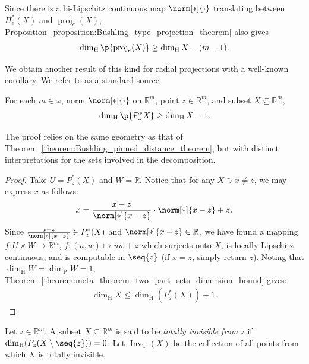 Since there is a bi-Lipschitz continuous map $\norm[*]{\cdot}$ translating between $\Pi^*_e(X)$ and $\operatorname{proj}_e(X)$, Proposition~\ref{proposition:Bushling_type_projection_theorem} also gives
\begin{align*}
    \dim_{\operatorname{H}}\p{\operatorname{proj}_e(X)} \geq \dim_{\operatorname{H}}X - (m - 1).
\end{align*}

We obtain another result of this kind for radial projections with a well-known corollary. We refer \cite{Orp19} to as a standard source.

\begin{proposition}
    \label{proposition:decomposition_result_for_radial_projections}
    For each $m \in \omega$, norm $\norm[*]{\cdot}$ on $\mathbb{R}^m$, point $z \in \mathbb{R}^m$, and subset $X \subseteq \mathbb{R}^m$,
    \begin{align*}
        \dim_{\operatorname{H}}\p{P^*_z X} \geq \dim_{\operatorname{H}} X - 1.
    \end{align*}
\end{proposition}
The proof relies on the same geometry as that of Theorem~\ref{theorem:Bushling_pinned_distance_theorem}, but with distinct interpretations for the sets involved in the decomposition.

\begin{proof}
    Take $U = P^*_z(X)$ and $W = \mathbb{R}$. Notice that for any $X \ni x \neq z$, we may express $x$ as follows:
    \begin{align*}
        x = \frac{x - z}{\norm[*]{x - z}} \cdot \norm[*]{x - z} + z.
    \end{align*}
    Since $\frac{x - z}{\norm[*]{x - z}} \in P^*_z(X)$ and $\norm[*]{x - z} \in \mathbb{R}$, we have found a mapping $f : U \times W \to \mathbb{R}^m$, $f: (u, w) \mapsto u w + z$ which surjects onto $X$, is locally Lipschitz continuous, and is computable in $\seq{z}$ (if $x = z$, simply return $z$). Noting that $\dim_{\operatorname{H}} W = \dim_{\operatorname{P}} W = 1$, Theorem~\ref{theorem:meta_theorem_two_part_sets_dimension_bound} gives:
    \begin{align*}
        \dim_{\operatorname{H}} X \leq \dim_{\operatorname{H}}(P^*_z(X)) + 1.
    \end{align*}
\end{proof}

\begin{definition}
    Let $z \in \mathbb{R}^m$. A subset $X \subseteq \mathbb{R}^m$ is said to be \textit{totally invisible from $z$} if $\dim_{\operatorname{H}}(P_z(X \setminus \seq{z})) = 0$. Let $\operatorname{Inv}_{\operatorname{T}}(X)$ be the collection of all points from which $X$ is totally invisible. 
\end{definition}

